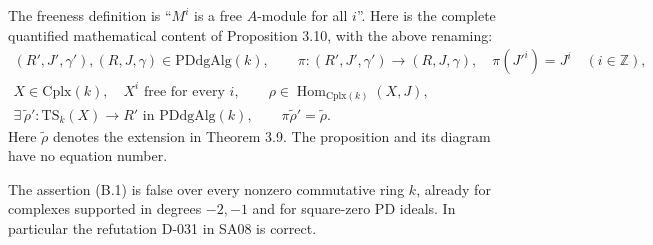 The freeness definition is ``$M^i$ is a free $A$-module for all $i$''.
Here is the complete quantified mathematical content of Proposition 3.10,
with the above renaming:
\[
\begin{gathered}
(R',J',\gamma'),(R,J,\gamma)\in\mathrm{PDdgAlg}(k),\qquad
\pi:(R',J',\gamma')\longrightarrow(R,J,\gamma),\quad
\pi(J'^i)=J^i\quad(i\in\mathbb Z),\\
X\in\mathrm{Cplx}(k),\quad X^i\text{ free for every }i,
\qquad \rho\in\operatorname{Hom}_{\mathrm{Cplx}(k)}(X,J),\\
\exists\,\widetilde\rho':\mathrm{TS}_k(X)\longrightarrow R'
\text{ in }\mathrm{PDdgAlg}(k),\qquad
\pi\widetilde\rho'=\widetilde\rho.
\end{gathered}                                                    \tag{B.1}
\]
Here $\widetilde\rho$ denotes the extension in Theorem 3.9.
The proposition and its diagram have no equation number.

\begin{proposition}[B-001 / D-031: Refuted]
\label{B001}
The assertion \textup{(B.1)} is false over every nonzero commutative ring
$k$, already for complexes supported in degrees $-2,-1$ and for
square-zero PD ideals.  In particular the refutation D-031 in SA08 is
correct.
\end{proposition}

